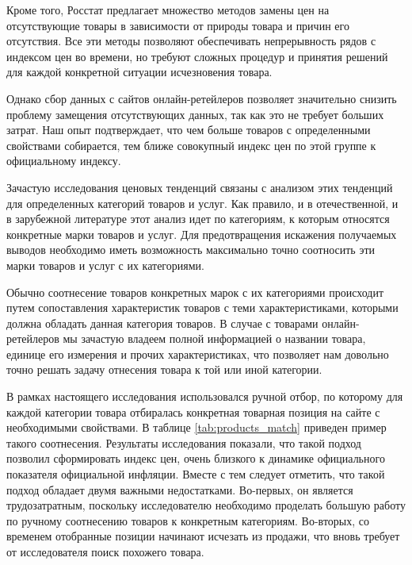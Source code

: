 Кроме того, Росстат предлагает множество методов замены цен на отсутствующие товары в зависимости от природы товара и причин его отсутствия. Все эти методы позволяют обеспечивать непрерывность рядов с индексом цен во времени, но требуют сложных процедур и принятия решений для каждой конкретной ситуации исчезновения товара.

Однако сбор данных с сайтов онлайн-ретейлеров позволяет значительно снизить проблему замещения отсутствующих данных, так как это не требует больших затрат. Наш опыт подтверждает, что чем больше товаров с определенными свойствами собирается, тем ближе совокупный индекс цен по этой группе к официальному индексу.


Зачастую исследования ценовых тенденций связаны с анализом этих тенденций для определенных категорий товаров и услуг. Как правило, и в отечественной, и в зарубежной литературе этот анализ идет по категориям, к которым относятся конкретные марки товаров и услуг. Для предотвращения искажения получаемых выводов необходимо иметь возможность максимально точно соотносить эти марки товаров и услуг с их категориями.

Обычно соотнесение товаров конкретных марок с их категориями происходит путем сопоставления характеристик товаров с теми характеристиками, которыми должна обладать данная категория товаров. В случае с товарами онлайн-ретейлеров мы зачастую владеем полной информацией о названии товара, единице его измерения и прочих характеристиках, что позволяет нам довольно точно решать задачу отнесения товара к той или иной категории.

В рамках настоящего исследования использовался ручной отбор, по которому для каждой категории товара отбиралась конкретная товарная позиция на сайте с необходимыми свойствами. В таблице \cref{tab:products_match} приведен пример такого соотнесения. Результаты исследования \cite{cavallo2016billion} показали, что такой подход позволил сформировать индекс цен, очень близкого к динамике официального показателя официальной инфляции. Вместе с тем следует отметить, что такой подход обладает двумя важными недостатками. Во-первых, он является трудозатратным, поскольку исследователю необходимо проделать большую работу по ручному соотнесению товаров к конкретным категориям. Во-вторых, со временем отобранные позиции начинают исчезать из продажи, что вновь требует от исследователя поиск похожего товара. 


